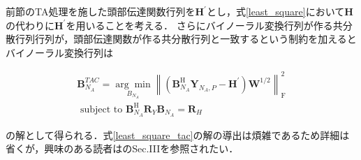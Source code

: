\documentclass[a4paper]{jsarticle}
\begin{document}
前節のTA処理を施した頭部伝達関数行列を$\mathbf{H}^\prime$とし，式\ref{least_square}において$\mathbf{H}$の代わりに$\mathbf{H}^\prime$を用いることを考える．
さらにバイノーラル変換行列が作る共分散行列行列が，頭部伝達関数が作る共分散行列と一致するという制約を加えるとバイノーラル変換行列は

\begin{equation}
    \label{least_square_tac}
    \begin{array}{l}
        \boldsymbol{B}_{N_{A}}^{T A C}=\underset{B_{N_{A}}}{\arg \min }\left\|\left(\boldsymbol{B}_{N_{A}}^{\mathrm{H}} \boldsymbol{Y}_{N_{A}, P}-\boldsymbol{H^\prime}\right) \boldsymbol{W}^{1 / 2}\right\|_{\mathrm{F}}^{2} \\
        \text { subject to } \boldsymbol{B}_{N_{A}}^{\mathrm{H}} \boldsymbol{R}_{Y} \boldsymbol{B}_{N_{A}}=\boldsymbol{R}_{H}
    \end{array}
\end{equation}

の解として得られる．式\ref{least_square_tac}の解の導出は煩雑であるため詳細は省くが，興味のある読者は\cite{Zaunschirm2018-mn}のSec.IIIを参照されたい．




\end{document}
